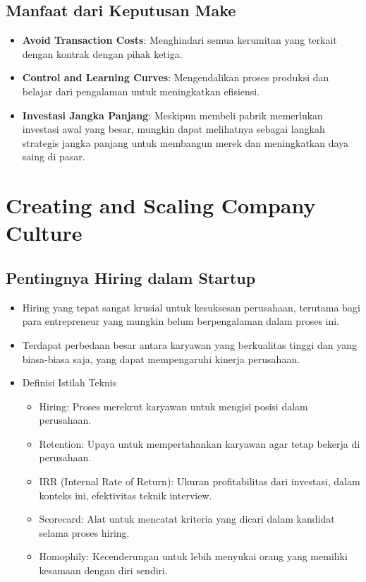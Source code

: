 \documentclass{article}
\begin{document}
\subsection{Manfaat dari Keputusan Make
}
\begin{itemize}
    \item \textbf{Avoid Transaction Costs}: Menghindari semua kerumitan yang terkait dengan kontrak dengan pihak ketiga.
    \item \textbf{Control and Learning Curves}: Mengendalikan proses produksi dan belajar dari pengalaman untuk meningkatkan efisiensi.
    \item \textbf{Investasi Jangka Panjang}: Meskipun membeli pabrik memerlukan investasi awal yang besar, mungkin dapat melihatnya sebagai langkah strategis jangka panjang untuk membangun merek dan meningkatkan daya saing di pasar.
\end{itemize}

\newpage
\section{Creating and Scaling Company Culture}
\subsection{Pentingnya Hiring dalam Startup}
\begin{itemize}
    \item Hiring yang tepat sangat krusial untuk kesuksesan perusahaan, terutama bagi para entrepreneur yang mungkin belum berpengalaman dalam proses ini.
    \item Terdapat perbedaan besar antara karyawan yang berkualitas tinggi dan yang biasa-biasa saja, yang dapat mempengaruhi kinerja perusahaan.
    \item Definisi Istilah Teknis
          \begin{itemize}
              \item Hiring: Proses merekrut karyawan untuk mengisi posisi dalam perusahaan.
              \item Retention: Upaya untuk mempertahankan karyawan agar tetap bekerja di perusahaan.
              \item IRR (Internal Rate of Return): Ukuran profitabilitas dari investasi, dalam konteks ini, efektivitas teknik interview.
              \item Scorecard: Alat untuk mencatat kriteria yang dicari dalam kandidat selama proses hiring.
              \item Homophily: Kecenderungan untuk lebih menyukai orang yang memiliki kesamaan dengan diri sendiri.
          \end{itemize}
\end{itemize}
\end{document}

